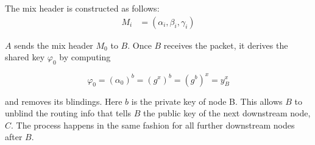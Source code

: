 The mix header is constructed as follows:
\begin{align}
    M_i & =(\alpha_i,\beta_i,\gamma_i)
\end{align}

$A$ sends the mix header $M_0$ to $B$. Once $B$ receives the packet, it derives the shared key $\varphi_0$ by computing

$$\varphi_0=(\alpha_0)^b=(g^x)^b=(g^b)^x=y^x_B$$

and removes its blindings. Here $b$ is the private key of node B. This allows $B$ to unblind the routing info that tells $B$ the public key of the next downstream node, $C$. The process happens in the same fashion for all further downstream nodes after $B$.

